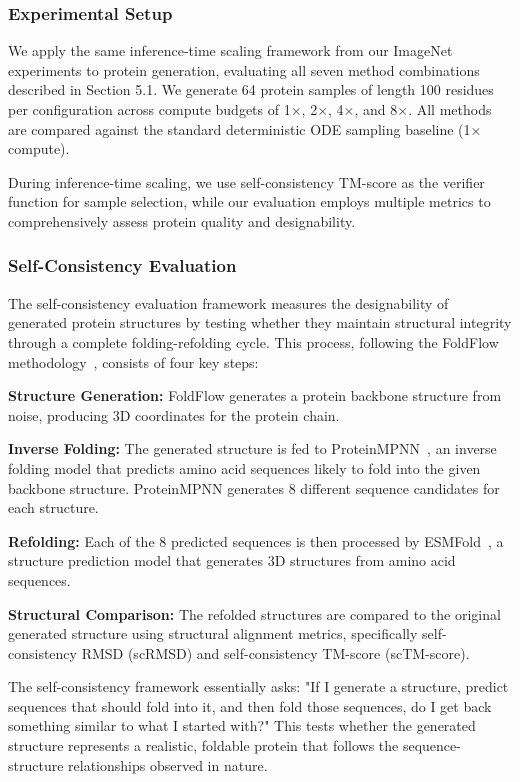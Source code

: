 \documentclass{article}
\begin{document}
\subsubsection{Experimental Setup}

We apply the same inference-time scaling framework from our ImageNet experiments to protein generation, evaluating all seven method combinations described in Section 5.1. We generate 64 protein samples of length 100 residues per configuration across compute budgets of 1×, 2×, 4×, and 8×. All methods are compared against the standard deterministic ODE sampling baseline (1× compute).

During inference-time scaling, we use self-consistency TM-score as the verifier function for sample selection, while our evaluation employs multiple metrics to comprehensively assess protein quality and designability.

\subsubsection{Self-Consistency Evaluation}

The self-consistency evaluation framework measures the designability of generated protein structures by testing whether they maintain structural integrity through a complete folding-refolding cycle. This process, following the FoldFlow methodology~\cite{foldflow2}, consists of four key steps:

\textbf{Structure Generation:} FoldFlow generates a protein backbone structure from noise, producing 3D coordinates for the protein chain.

\textbf{Inverse Folding:} The generated structure is fed to ProteinMPNN~\cite{proteinmpnn}, an inverse folding model that predicts amino acid sequences likely to fold into the given backbone structure. ProteinMPNN generates 8 different sequence candidates for each structure.

\textbf{Refolding:} Each of the 8 predicted sequences is then processed by ESMFold~\cite{esmfold}, a structure prediction model that generates 3D structures from amino acid sequences.

\textbf{Structural Comparison:} The refolded structures are compared to the original generated structure using structural alignment metrics, specifically self-consistency RMSD (scRMSD) and self-consistency TM-score (scTM-score).

The self-consistency framework essentially asks: "If I generate a structure, predict sequences that should fold into it, and then fold those sequences, do I get back something similar to what I started with?" This tests whether the generated structure represents a realistic, foldable protein that follows the sequence-structure relationships observed in nature.
\end{document}
